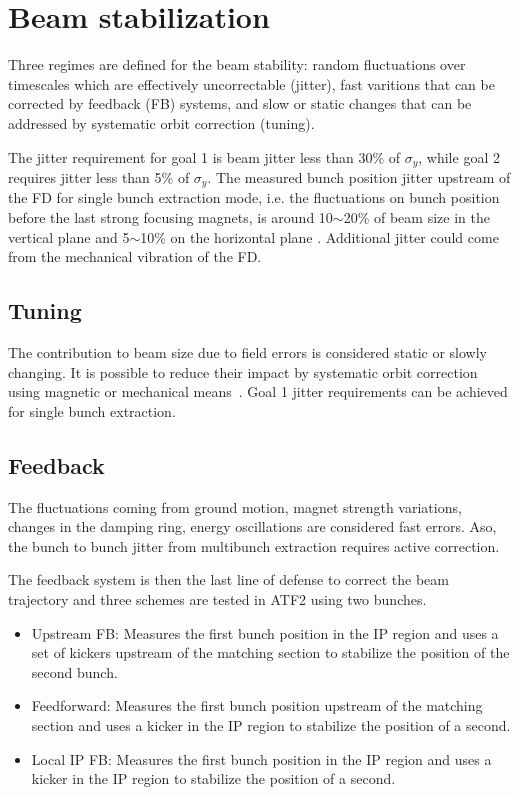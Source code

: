 {{\section{Beam stabilization}
Three regimes are defined for the beam stability: random fluctuations over timescales which are effectively uncorrectable (jitter), fast varitions that can be corrected by feedback (FB) systems, and slow or static changes that can be addressed by systematic orbit correction (tuning).\par
The jitter requirement for goal 1 is beam jitter less than 30\% of $\sigma_y$, while goal 2 requires jitter less than 5\% of $\sigma_y$. The measured bunch position jitter upstream of the FD for single bunch extraction mode, i.e. the fluctuations on bunch position before the last strong focusing magnets, is around 10$\sim$20\% of beam size in the vertical plane and 5$\sim$10\% on the horizontal plane \cite{PateckiJitter}. Additional jitter could come from the mechanical vibration of the FD.\par
\subsection{Tuning}
The contribution to beam size due to field errors is considered static or slowly changing. It is possible to reduce their impact by systematic orbit correction using magnetic or mechanical means~\cite{ATF2prop}. Goal 1 jitter requirements can be achieved for single bunch extraction.\par
\subsection{Feedback}
The fluctuations coming from ground motion, magnet strength variations, changes in the damping ring, energy oscillations are considered fast errors. Aso, the bunch to bunch jitter from multibunch extraction requires active correction.\par 
The feedback system is then the last line of defense to correct the beam trajectory and three schemes are tested in ATF2 using two bunches.\par
\begin{itemize}
 \item Upstream FB: Measures the first bunch position in the IP region and uses a set of kickers upstream of the matching section to stabilize the position of the second bunch.
 \item Feedforward: Measures the first bunch position upstream of the matching section and uses a kicker in the IP region to stabilize the position of a second.
 \item Local IP FB: Measures the first bunch position in the IP region and uses a kicker in the IP region to stabilize the position of a second.
\end{itemize}

}}

